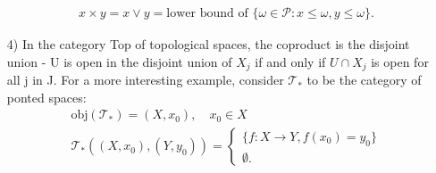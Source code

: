 \documentclass[../category_theory.tex]{subfiles}
\begin{document}
\begin{example}
\begin{itemize}
\begin{align*}
			       & x \times y = x\vee y = \text{lower bound of }\{\omega \in \mathcal{P}: x\leq \omega , y\leq \omega \}.
		      \end{align*}
		\item[4)] In the category Top of topological spaces, the coproduct is the disjoint union - U is open in the disjoint union of \(X_{j}\) if and only if \(U \cap X_{j}\) is open for all j in J. For a more interesting example, consider \(\mathcal{T}_{*}\) to be the category of ponted spaces:
		      \begin{align*}
			       & \mathrm{obj}(\mathcal{T}_{*})=(X, x_{0}),\quad x_{0}\in X                              \\
			       & \mathcal{T}_{*}((X, x_{0}), (Y, y_{0}))  = \left\{\begin{array}{ll}
				                                                           \{f:X\rightarrow Y, f(x_{0})=y_{0}\} \\
				                                                           \emptyset .
			                                                           \end{array}\right.
		      \end{align*}


\end{itemize}
\end{example}
\end{document}

